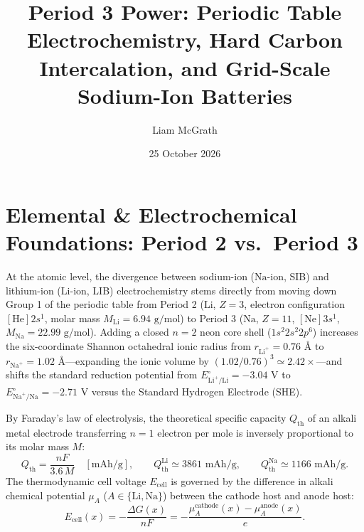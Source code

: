 \documentclass[11pt]{article}
\title{Period 3 Power: Periodic Table Electrochemistry, Hard Carbon Intercalation, and Grid-Scale Sodium-Ion Batteries}
\author{Liam McGrath}
\date{25 October 2026}
\begin{document}
\maketitle
\tableofcontents

\section{Elemental \& Electrochemical Foundations: Period 2 vs.\ Period 3}
\label{sec:periodic-electrochemistry}
At the atomic level, the divergence between sodium-ion ($\text{Na}$-ion, SIB) and lithium-ion ($\text{Li}$-ion, LIB) electrochemistry stems directly from moving down Group 1 of the periodic table from Period 2 ($\text{Li}$, $Z = 3$, electron configuration $[\text{He}]2s^1$, molar mass $M_{\text{Li}} = 6.94\text{ g/mol}$) to Period 3 ($\text{Na}$, $Z = 11$, $[\text{Ne}]3s^1$, $M_{\text{Na}} = 22.99\text{ g/mol}$). Adding a closed $n=2$ neon core shell ($1s^2 2s^2 2p^6$) increases the six-coordinate Shannon octahedral ionic radius from $r_{\text{Li}^+} = 0.76\text{ \AA}$ to $r_{\text{Na}^+} = 1.02\text{ \AA}$---expanding the ionic volume by $(1.02 / 0.76)^3 \simeq 2.42\times$---and shifts the standard reduction potential from $E^\circ_{\text{Li}^+/\text{Li}} = -3.04\text{ V}$ to $E^\circ_{\text{Na}^+/\text{Na}} = -2.71\text{ V}$ versus the Standard Hydrogen Electrode (SHE).

By Faraday's law of electrolysis, the theoretical specific capacity $Q_{\text{th}}$ of an alkali metal electrode transferring $n=1$ electron per mole is inversely proportional to its molar mass $M$:
\begin{equation}
Q_{\text{th}} = \frac{nF}{3.6\,M} \quad [\text{mAh/g}], \qquad
Q_{\text{th}}^{\text{Li}} \simeq 3861\text{ mAh/g}, \qquad
Q_{\text{th}}^{\text{Na}} \simeq 1166\text{ mAh/g}.
\label{eq:faraday-capacity}
\end{equation}
The thermodynamic cell voltage $E_{\text{cell}}$ is governed by the difference in alkali chemical potential $\mu_A$ ($A \in \{\text{Li}, \text{Na}\}$) between the cathode host and anode host:
\begin{equation}
E_{\text{cell}}(x) = -\frac{\Delta G(x)}{nF} = -\frac{\mu_A^{\text{cathode}}(x) - \mu_A^{\text{anode}}(x)}{e}.
\label{eq:chemical-potential}
\end{equation}
\end{document}
